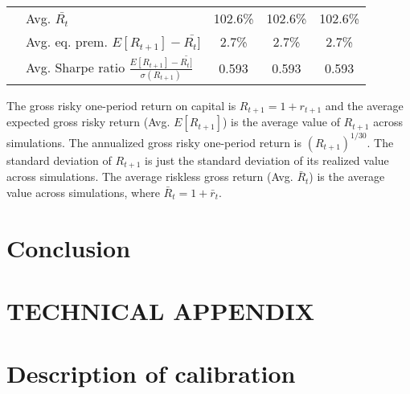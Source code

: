 \documentclass[letterpaper,12pt]{article}
\theoremstyle{definition}
\begin{document}
\begin{spacing}{1.5}
\begin{table}[htbp]
\begin{threeparttable}
\begin{tabular}{>{\small}l| >{\small}l| >{\small}c| >{\small}c| >{\small}c}
      & \quad Avg. $\bar{R_t}$ & 102.6\% & 102.6\% & 102.6\% \\
      & \quad Avg. eq. prem. $E[R_{t+1}] - \bar{R_t]}$ & 2.7\% & 2.7\% & 2.7\% \\
      & \quad Avg. Sharpe ratio $\frac{E[R_{t+1}] - \bar{R_t]}}{\sigma(R_{t+1})}$ & 0.593 & 0.593 & 0.593 \\
      \hline\hline
    \end{tabular}
    \begin{tablenotes}
      \scriptsize{\item[]The gross risky one-period return on capital is $R_{t+1} = 1 + r_{t+1}$ and the average expected gross risky return (Avg. $E[R_{t+1}]$) is the average value of $R_{t+1}$ across simulations. The annualized gross risky one-period return is $(R_{t+1})^{1/30}$. The standard deviation of $R_{t+1}$ is just the standard deviation of its realized value across simulations. The average riskless gross return (Avg. $\bar{R}_t$) is the average value across simulations, where $\bar{R}_t=1+\bar{r}_t$.}
    \end{tablenotes}
    \end{threeparttable}
  \end{table}

  \clearpage


\section{Conclusion}\label{SecConclusion}


\end{spacing}




\newpage
\renewcommand{\theequation}{T.\arabic{section}.\arabic{equation}}
\renewcommand{\thesection}{T-\arabic{section}}   %

\setcounter{equation}{0}                         %
\setcounter{section}{0}                          %
\section*{TECHNICAL APPENDIX}

\setcounter{equation}{0}                         %
\section{Description of calibration}\label{SecTAppCalib}
\end{document}
